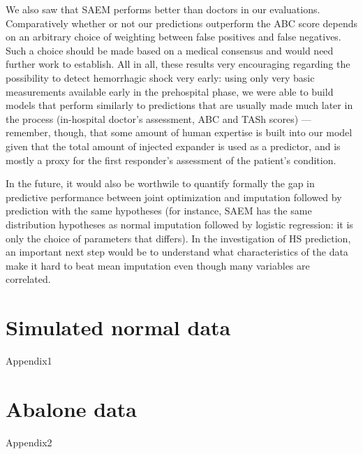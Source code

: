 \documentclass[12pt, a4paper]{memoir}
\begin{document}
We also saw that SAEM performs better than doctors in our evaluations. Comparatively whether or not our predictions outperform the ABC score depends on an arbitrary choice of weighting between false positives and false negatives. Such a choice should be made based on a medical consensus and would need further work to establish. All in all, these results very encouraging regarding the possibility to detect hemorrhagic shock very early: using only very basic measurements available early in the prehospital phase, we were able to build models that perform similarly to predictions that are usually made much later in the process (in-hospital doctor's assessment, ABC and TASh scores) --- remember, though, that some amount of human expertise is built into our model given that the total amount of injected expander is used as a predictor, and is mostly a proxy for the first responder's assessment of the patient's condition. 

In the future, it would also be worthwile to quantify formally the gap in predictive performance between joint optimization and imputation followed by prediction with the same hypotheses (for instance, SAEM has the same distribution hypotheses as normal imputation followed by logistic regression: it is only the choice of parameters that differs). In the investigation of HS prediction, an important next step would be to understand what characteristics of the data make it hard to beat mean imputation even though many variables are correlated.
\begin{appendices}
\chapter{Simulated normal data}
\label{simulation}
{Appendix1}

\chapter{Abalone data}
\label{abalone}
{Appendix2}
\end{appendices}


\end{document}
